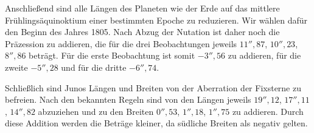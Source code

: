 Anschließend sind alle Längen des Planeten wie der Erde auf das mittlere Frühlingsäquinoktium einer bestimmten Epoche zu reduzieren. Wir wählen dafür den Beginn des Jahres 1805. Nach Abzug der Nutation ist daher noch die Präzession zu addieren, die für die drei Beobachtungen jeweils $11''{,}87$, $10''{,}23$, $8''{,}86$ beträgt. Für die erste Beobachtung ist somit $-3''{,}56$ zu addieren, für die zweite $-5''{,}28$ und für die dritte $-6''{,}74$.

Schließlich sind Junos Längen und Breiten von der Aberration der Fixsterne zu befreien. Nach den bekannten Regeln sind von den Längen jeweils $19''{,}12$, $17''{,}11$, $14''{,}82$ abzuziehen und zu den Breiten $0''{,}53$, $1''{,}18$, $1''{,}75$ zu addieren. Durch diese Addition werden die Beträge kleiner, da südliche Breiten als negativ gelten.

